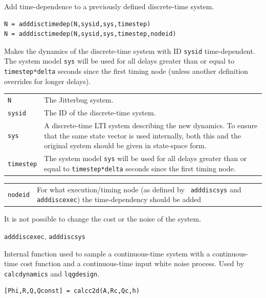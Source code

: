 \documentclass[final,twoside]{rapport}  %
\begin{document}
\purpose
Add time-dependence to a previously defined discrete-time system.

\syntax
\begin{verbatim}
N = adddisctimedep(N,sysid,sys,timestep)
N = adddisctimedep(N,sysid,sys,timestep,nodeid)
\end{verbatim}

\descr
Makes the dynamics of the discrete-time system with ID {\tt sysid}
time-dependent. The system model {\tt sys} will be used for all delays
greater than or equal to {\tt timestep*delta} seconds since the first
timing node (unless another definition overrides for longer delays).
 
\args
\begin{tabularx}{\hsize}{l>{\raggedright\arraybackslash}X}
{\tt  N} &  The {\sc Jitterbug} system.\\
{\tt sysid} &  The ID of the discrete-time system.\\
{\tt sys} & A discrete-time LTI system describing the new dynamics. To
ensure that the same state vector is used 
internally, both this and the original system should be
given in state-space form.\\
{\tt timestep} & The system model {\tt sys} will be used for all delays
greater than or equal to {\tt timestep*delta} seconds since the first
          timing node.
\end{tabularx}

\optargs
\begin{tabularx}{\hsize}{l>{\raggedright\arraybackslash}X}
{\tt nodeid} & For what execution/timing node (as defined by {\tt
  adddiscsys} and {\tt adddiscexec}) the time-dependency should be added
\end{tabularx}

\remark
It is not possible to change the cost or the noise of the
system.

\seealso
{\tt adddiscexec}, {\tt adddiscsys}


\label{sec:calcc2d}

\purpose
Internal function used to sample a continuous-time system with a
continuous-time cost function and a continuous-time input white noise
process. Used by {\tt calcdynamics} and {\tt lqgdesign}.

\syntax
\begin{verbatim}
[Phi,R,Q,Qconst] = calcc2d(A,Rc,Qc,h)
\end{verbatim}
\end{document}
